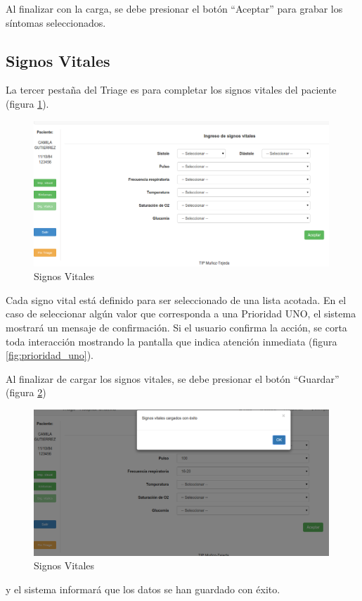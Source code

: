 Al finalizar con la carga, se debe presionar el botón ``Aceptar'' para grabar los síntomas seleccionados.


\subsection{Signos Vitales}
La tercer pestaña del Triage es para completar los signos vitales del paciente (figura \ref{fig:signos_vitales}).
\begin{figure}
\centerline{\includegraphics[width=0.99\textwidth]{signos_vitales.png}}
\caption{Signos Vitales} \label{fig:signos_vitales}
\end{figure}
Cada signo vital está definido para ser seleccionado de una lista acotada. En el caso de seleccionar algún valor que corresponda a una Prioridad UNO, el sistema mostrará un mensaje de confirmación. Si el usuario confirma la acción, se corta toda interacción mostrando la pantalla que indica atención inmediata (figura \ref{fig:prioridad_uno}).

Al finalizar de cargar los signos vitales, se debe presionar el botón ``Guardar'' (figura \ref{fig:signos_vitales_guardar})
\begin{figure}
\centerline{\includegraphics[width=0.99\textwidth]{signos_vitales_guardar.png}}
\caption{Signos Vitales} \label{fig:signos_vitales_guardar}
\end{figure}
y el sistema informará que los datos se han guardado con éxito.


